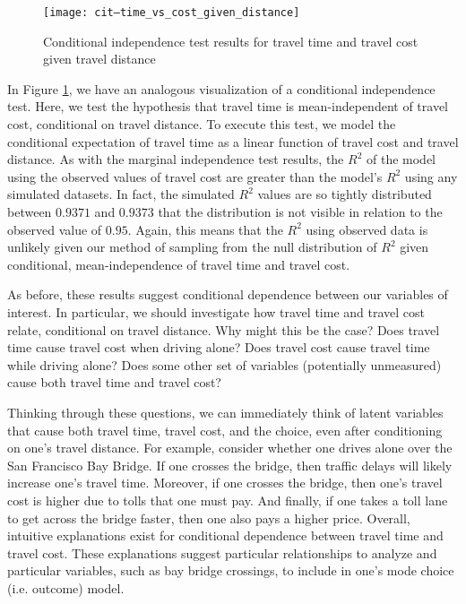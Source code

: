 \begin{figure}
   \centering
   \texttt{[image: cit--time\_vs\_cost\_given\_distance]}
   \caption{Conditional independence test results for travel time and travel cost given travel distance}
   \label{fig:conditional-independence-test}
\end{figure}
In Figure \ref{fig:conditional-independence-test}, we have an analogous visualization of a conditional independence test.
Here, we test the hypothesis that travel time is mean-independent of travel cost, conditional on travel distance.
To execute this test, we model the conditional expectation of travel time as a linear function of travel cost and travel distance.
As with the marginal independence test results, the $R^2$ of the model using the observed values of travel cost are greater than the model's $R^2$ using any simulated datasets.
In fact, the simulated $R^2$ values are so tightly distributed between $0.9371$ and $0.9373$ that the distribution is not visible in relation to the observed value of $0.95$.
Again, this means that the $R^2$ using observed data is unlikely given our method of sampling from the null distribution of $R^2$ given conditional, mean-independence of travel time and travel cost.

As before, these results suggest conditional dependence between our variables of interest.
In particular, we should investigate how travel time and travel cost relate, conditional on travel distance.
Why might this be the case?
Does travel time cause travel cost when driving alone?
Does travel cost cause travel time while driving alone?
Does some other set of variables (potentially unmeasured) cause both travel time and travel cost?

Thinking through these questions, we can immediately think of latent variables that cause both travel time, travel cost, and the choice, even after conditioning on one's travel distance.
For example, consider whether one drives alone over the San Francisco Bay Bridge.
If one crosses the bridge, then traffic delays will likely increase one's travel time.
Moreover, if one crosses the bridge, then one's travel cost is higher due to tolls that one must pay.
And finally, if one takes a toll lane to get across the bridge faster, then one also pays a higher price.
Overall, intuitive explanations exist for conditional dependence between travel time and travel cost.
These explanations suggest particular relationships to analyze and particular variables, such as bay bridge crossings, to include in one's mode choice (i.e. outcome) model.


